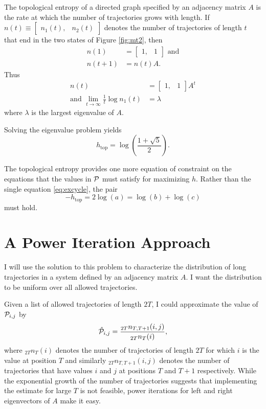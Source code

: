 \documentclass[12pt]{article} \usepackage{amsmath,amsfonts}
\newcommand{\htop}{{h_{\text{top}}}}
\newcommand{\T}{{\cal P}}
\begin{document}
The topological entropy of a directed graph specified by an adjacency
matrix $A$ is the rate at which the number of trajectories grows with
length.  If $n(t)\equiv\begin{bmatrix} n_1(t),&n_2(t)\end{bmatrix}$
denotes the number of trajectories of length $t$ that end in the two
states of Figure \ref{fig:mt2}, then
\begin{align*}
  n(1) &= \begin{bmatrix} 1,&1\end{bmatrix} \text{ and} \\
  n(t+1) &= n(t) A.
\end{align*}
Thus
\begin{align*}
  n(t) &= \begin{bmatrix} 1,&1\end{bmatrix} A^t \\
  \text{and }\lim_{t\rightarrow \infty} \frac{1}{t} \log n_1(t) &=
  \lambda
\end{align*}
where $\lambda$ is the largest eigenvalue of $A$.

Solving the eigenvalue problem yields
\begin{equation*}
  \htop = \log\left(\frac{1+\sqrt{5}}{2}\right).
\end{equation*}

The topological entropy provides one more equation of constraint on
the equations that the values in $\T$ must satisfy for maximizing $h$.
Rather than the single equation \eqref{eq:excycle}, the pair
\begin{equation*}
  - \htop = 2\log(a) = \log(b) + \log(c)
\end{equation*}
must hold.

\section{A Power Iteration Approach}
\label{sec:algorithm}

I will use the solution to this problem to characterize the
distribution of long trajectories in a system defined by an adjacency
matrix $A$.  I want the distribution to be uniform over all allowed
trajectories.

Given a list of allowed trajectories of length $2T$, I could
approximate the value of $\T_{i,j}$ by
\begin{equation*}
  \hat \T_{i,j} = \frac{_{2T}n_{T,T+1}(i,j)}{_{2T}n_{T}(i)},
\end{equation*}
where $_{2T}n_{T}(i)$ denotes the number of trajectories of length
$2T$ for which $i$ is the value at position $T$ and similarly
$_{2T}n_{T,T+1}(i,j)$ denotes the number of trajectories that have
values $i$ and $j$ at positions $T$ and $T+1$ respectively.  While the
exponential growth of the number of trajectories suggests that
implementing the estimate for large $T$ is not feasible, power
iterations for left and right eigenvectors of $A$ make it easy.
\end{document}
